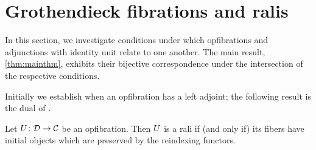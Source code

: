 \documentclass{amsart}
\begin{document}
\section{Grothendieck fibrations and ralis}

In this section, we investigate conditions under which opfibrations and adjunctions with identity unit relate to one another. The main result, \cref{thm:mainthm}, exhibits their bijective correspondence under the intersection of the respective conditions.

Initially we establish when an opfibration has a left adjoint; the following result is the dual of \cite[Prop. 4.4]{Grayfibredandcofibred}.

\begin{prop}\label{prop:opfibtolari}
 Let $U\colon\mathcal{D}\to\mathcal{C}$ be an opfibration. Then $U$ is a rali if (and only if) its fibers have initial objects which are preserved by the reindexing functors. 
\end{prop}
\end{document}
